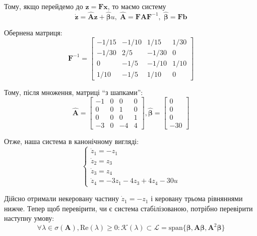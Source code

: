 \documentclass[oneside,solution]{karazin-control-assign}
\begin{document}
Тому, якщо перейдемо до $\mathbf{z}=\boldsymbol{F}\mathbf{x}$, то маємо систему
\begin{equation}
    \dot{\mathbf{z}} = \hat{\boldsymbol{A}}\mathbf{z} + \hat{\boldsymbol{\beta}}u, \; \hat{\boldsymbol{A}} = \boldsymbol{FAF}^{-1}, \; \hat{\boldsymbol{\beta}} = \boldsymbol{F}\mathbf{b}
\end{equation}

Обернена матриця:
\begin{equation}
    \boldsymbol{F}^{-1} = \begin{bmatrix}
        -1/15 & -1/10 & 1/15 & 1/30 \\
        -1/30 & 2/5 & -1/30 & 0 \\
        0 & -1/5 & -1/10 & 1/10 \\
        1/10 & -1/5 & 1/10 & 0
    \end{bmatrix}
\end{equation}

Тому, після множення, матриці ``з шапками'':
\begin{equation}
    \hat{\boldsymbol{A}} = \begin{bmatrix}
        -1 & 0 & 0 & 0\\
        0 & 0 & 1 & 0 \\
        0 & 0 & 0 & 1 \\
        -3 & 0 & -4 & 4
    \end{bmatrix}, \hat{\boldsymbol{\beta}} = \begin{bmatrix}
        0 \\ 0 \\ 0 \\ -30
    \end{bmatrix}
\end{equation}

Отже, наша система в канонічному вигляді:
\begin{equation}
    \begin{cases}
        \dot{z}_1 = -z_1 \\
        \dot{z}_2 = z_3 \\
        \dot{z}_3 = z_4 \\
        \dot{z}_4 = -3z_1 - 4z_3 + 4z_4 -30u
    \end{cases}
\end{equation}

Дійсно отримали некеровану частину $\dot{z}_1=-z_1$ і керовану трьома рівняннями нижче. Тепер щоб перевірити, чи є система стабілізованою, потрібно перевірити наступну умову:
\begin{equation}
    \forall \lambda \in \sigma(\boldsymbol{A}), \text{Re}(\lambda) \geq 0: \mathcal{K}(\lambda) \subset \mathcal{L} = \text{span}\{\boldsymbol{\beta},\boldsymbol{A\beta},\boldsymbol{A}^2\boldsymbol{\beta}\}
\end{equation}
\end{document}
